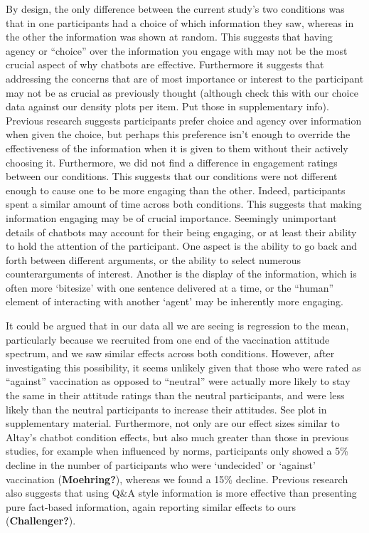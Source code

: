 \documentclass[
  english,
  ,jou,floatsintext]{apa6}
\begin{document}
By design, the only difference between the current study's two conditions was that in one participants had a choice of which information they saw, whereas in the other the information was shown at random. This suggests that having agency or ``choice'' over the information you engage with may not be the most crucial aspect of why chatbots are effective. Furthermore it suggests that addressing the concerns that are of most importance or interest to the participant may not be as crucial as previously thought (although check this with our choice data against our density plots per item. Put those in supplementary info). Previous research suggests participants prefer choice and agency over information when given the choice, but perhaps this preference isn't enough to override the effectiveness of the information when it is given to them without their actively choosing it. Furthermore, we did not find a difference in engagement ratings between our conditions. This suggests that our conditions were not different enough to cause one to be more engaging than the other. Indeed, participants spent a similar amount of time across both conditions. This suggests that making information engaging may be of crucial importance. Seemingly unimportant details of chatbots may account for their being engaging, or at least their ability to hold the attention of the participant. One aspect is the ability to go back and forth between different arguments, or the ability to select numerous counterarguments of interest. Another is the display of the information, which is often more `bitesize' with one sentence delivered at a time, or the ``human'' element of interacting with another `agent' may be inherently more engaging.

It could be argued that in our data all we are seeing is regression to the mean, particularly because we recruited from one end of the vaccination attitude spectrum, and we saw similar effects across both conditions. However, after investigating this possibility, it seems unlikely given that those who were rated as ``against'' vaccination as opposed to ``neutral'' were actually more likely to stay the same in their attitude ratings than the neutral participants, and were less likely than the neutral participants to increase their attitudes. See plot in supplementary material. Furthermore, not only are our effect sizes similar to Altay's chatbot condition effects, but also much greater than those in previous studies, for example when influenced by norms, participants only showed a 5\% decline in the number of participants who were `undecided' or `against' vaccination (\textbf{Moehring?}), whereas we found a 15\% decline. Previous research also suggests that using Q\&A style information is more effective than presenting pure fact-based information, again reporting similar effects to ours (\textbf{Challenger?}).
\end{document}
